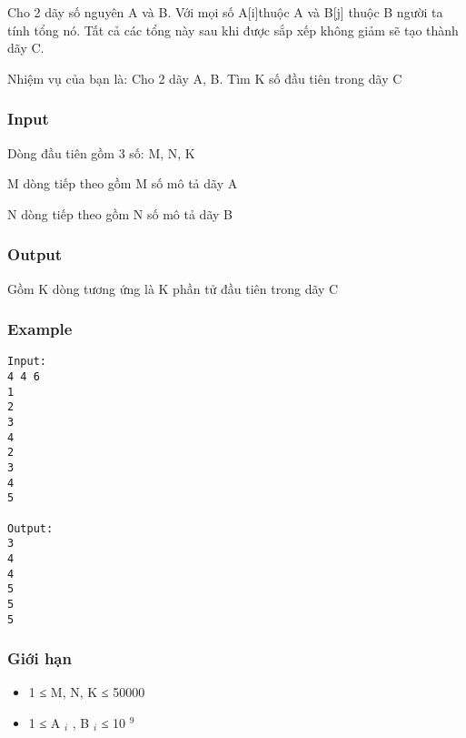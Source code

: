 



   Cho 2 dãy số nguyên A và B. Với mọi số A[i]thuộc A và B[j] thuộc B người ta tính tổng nó. Tất cả các tổng này sau khi được sắp xếp không giảm sẽ tạo thành dãy C.  

   Nhiệm vụ của bạn là: Cho 2 dãy A, B. Tìm K số đầu tiên trong dãy C  

\subsubsection{   Input  }

   Dòng đầu tiên gồm 3 số: M, N, K  

   M dòng tiếp theo gồm M số mô tả dãy A  

   N dòng tiếp theo gồm N số mô tả dãy B  

\subsubsection{   Output  }

   Gồm K dòng tương ứng là K phần tử đầu tiên trong dãy C  

\subsubsection{   Example  }
\begin{verbatim}
Input:
4 4 6
1
2
3
4
2
3
4
5

Output:
3
4
4
5
5
5
\end{verbatim}

\subsubsection{   Giới hạn  }
\begin{itemize}
	\item     1 ≤ M, N, K ≤ 50000   
	\item     1 ≤ A    $_     i    $    , B    $_     i    $    ≤ 10    $^     9    $
\end{itemize}